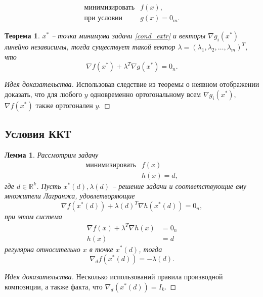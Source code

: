 \documentclass[10pt,a4paper]{article}
\newtheorem{theorem_ru}{Теорема}[section]
\newtheorem{lemma_ru}{Лемма}[section]
\newenvironment{sketch}
    {\begin{proof}[Идея доказательства]
    }
    { 
    \end{proof}
    }
\begin{document}
\begin{equation}\label{cond_extr}
\begin{array}{ll}
\mbox{минимизировать} &f(x),\\
\mbox{при условии}    &g(x)=0_m.
\end{array}
\end{equation}

\begin{theorem_ru}
$x^*$ -- точка минимума задачи \eqref{cond_extr} и векторы $\nabla g_i (x^*)$ линейно независимы, тогда существует такой вектор $\lambda=(\lambda_1, \lambda_2, \ldots, \lambda_m)^T$, что
$$
\nabla f(x^*)+ \lambda^T\nabla g(x^*)=0_n.
$$
\end{theorem_ru}

\begin{sketch}
Использовав следствие из теоремы о неявном отображении доказать, что для любого $y$ одновременно ортогональному всем $\nabla g_i(x^*)$, $\nabla f(x^*)$ также ортогонален $y$.
\end{sketch}

\subsection{Условия ККТ}
\begin{lemma_ru}
Рассмотрим задачу
$$
\begin{array}{ll}
\mbox{минимизировать} & f(x) \\
 & h(x)=d,
\end{array}
$$
где $d\in \mathbb{R}^k$. Пусть $x^*(d), \lambda(d)$ -- решение задачи и соответствующие ему множители Лагранжа, удовлетворяющие
$$
\nabla f(x^*(d))+\lambda(d)^T \nabla h(x^*(d))=0_n,
$$
при этом система
\begin{align*}
\nabla f(x)+\lambda^T \nabla h(x)&=0_n\\
h(x)&=d
\end{align*}
регулярна относительно $x$ в точке $x^*(d)$, тогда
$$
\nabla_d f(x^*(d)) = -\lambda(d).
$$
\end{lemma_ru}
\begin{sketch}
Несколько использований правила производной композиции, а также факта, что $\nabla_d(x^*(d))=I_k$.
\end{sketch}
\end{document}
